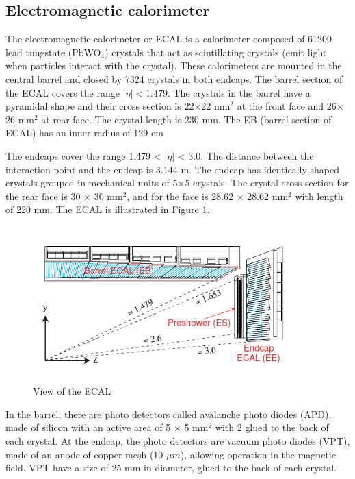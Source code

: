 \subsection{Electromagnetic calorimeter}

The electromagnetic calorimeter or ECAL is a calorimeter composed of 61200 lead tungstate (PbWO$_4$) crystals that act as scintillating crystals (emit light when particles interact with the crystal). These calorimeters are mounted in the central barrel and closed by 7324 crystals in both endcaps. The barrel section of the ECAL covers the range $|\eta| < 1.479$. The crystals in the barrel have a pyramidal shape and their cross section is 22$\times$22 mm$^2$ at the front face and 26$\times$26 mm$^2$ at rear face. The crystal length is 230 mm. The EB (barrel section of ECAL) has an inner radius of 129 cm\cite{cms-manual}

The endcaps cover the range 1.479 < $|\eta|$ < 3.0. The distance between the interaction point and the endcap is 3.144 m. The endcap has identically shaped crystals grouped in mechanical units of 5×5 crystals. The crystal cross section for the rear face is 30 $\times$ 30 mm$^2$, and for the face is 28.62 $\times$ 28.62 mm$^2$ with length of 220 mm. The ECAL is illustrated in Figure \ref{ecal}.

\begin{figure}[ht]
	\centering
	\includegraphics[width=10cm,height=6cm]{Chapter2/ecal.png}
	\caption[View of the ECAL]{View of the ECAL\cite{cms-manual}}\label{ecal}
\end{figure}
In the barrel, there are photo detectors called avalanche photo diodes (APD), made of silicon with an active area of 5 $\times$ 5 mm$^2$ with 2 glued to the back of each crystal. At the endcap, the photo detectors are vacuum photo diodes (VPT), made of an anode of copper mesh (10 $\mu m$), allowing operation in the magnetic field. VPT have a size of 25 mm in diameter, glued to the back of each crystal.

